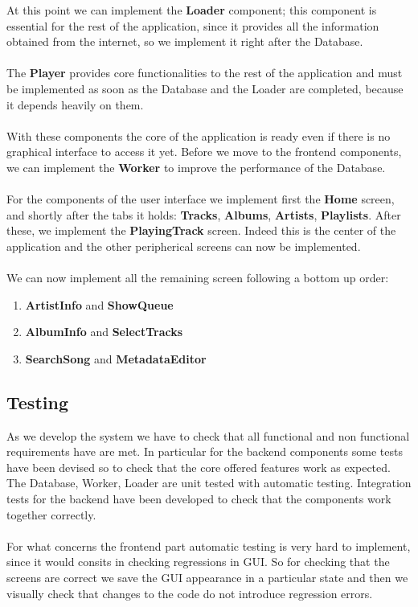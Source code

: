\documentclass{article}
\begin{document}
At this point we can implement the \textbf{Loader} component; this component is essential
for the rest of the application, since it provides all the information obtained
from the internet, so we implement it right after the Database.
\\\\
The \textbf{Player} provides core functionalities to the rest of the application
and must be implemented as soon as the Database and the Loader are completed,
because it depends heavily on them.
\\\\
With these components the core of the application is ready even if there is no
graphical interface to access it yet. Before we move to the frontend components,
we can implement the \textbf{Worker} to improve the performance of
the Database.
\\\\
For the components of the user interface we implement first the \textbf{Home}
screen, and shortly after the tabs it holds: \textbf{Tracks}, \textbf{Albums},
\textbf{Artists}, \textbf{Playlists}. After these, we implement the
\textbf{PlayingTrack} screen. Indeed this is the center of the application and
the other peripherical screens can now be implemented.
\\\\
We can now implement all the remaining screen following a bottom up order:
\begin{enumerate}
    \item \textbf{ArtistInfo} and \textbf{ShowQueue}
    \item \textbf{AlbumInfo} and \textbf{SelectTracks}
    \item \textbf{SearchSong} and \textbf{MetadataEditor}
\end{enumerate}

\subsection{Testing}
As we develop the system we have to check that all functional and non functional
requirements have are met. In particular for the backend components some tests
have been devised so to check that the core offered features work as expected.
The Database, Worker, Loader are unit tested with automatic testing. Integration
tests for the backend have been developed to check that the components work
together correctly.
\\\\
For what concerns the frontend part automatic testing is very hard to implement,
since it would consits in checking regressions in GUI. So for checking that the
screens are correct we save the GUI appearance in a particular state and then we
visually check that changes to the code do not introduce regression errors.
\end{document}
